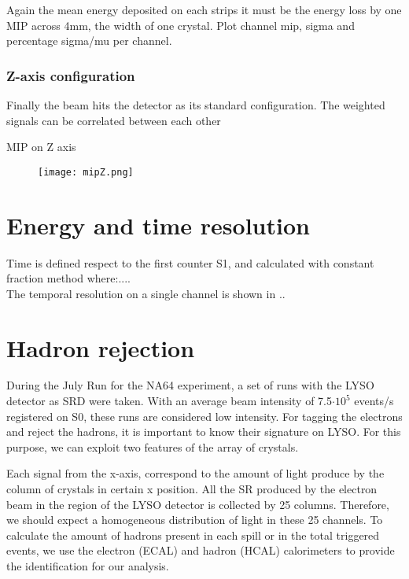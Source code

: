 Again the mean energy deposited on each strips it must be the energy loss by one MIP across 4mm, the width of one
crystal. 
Plot channel mip, sigma and percentage sigma/mu per channel.
\subsubsection{Z-axis configuration}
Finally the beam hits the detector as its standard configuration. The weighted signals can be correlated between each
other

MIP on Z axis\\
\begin{figure}[ht]
	\hspace*{\fill}
	\centering
	\texttt{[image: mipZ.png]}
	\hspace*{\fill}
	\caption{}\label{mipz}
\end{figure}


\section{Energy and time resolution}
Time is defined respect to the first counter S1, and calculated with constant fraction method where:....\\
The temporal resolution on a single channel is shown in ..\\


\section{Hadron rejection}

During the July Run for the NA64 experiment, a set of runs with the LYSO detector as SRD were taken. With an average
beam intensity of 7.5$\cdot 10^5$ events/s registered on S0, these runs are considered low intensity. For tagging the
electrons and reject the hadrons, it is important to know their signature on LYSO. For this purpose, we can exploit two
features of the array of crystals.\par

Each signal from the x-axis, correspond to the amount of light produce by the column of crystals in certain x position.
All the SR produced by the electron beam in the region of the LYSO detector is collected by 25 columns. Therefore, we
should expect a homogeneous distribution of light in these 25 channels. To calculate the amount of hadrons present in
each spill or in the total triggered events, we use the electron (ECAL) and hadron (HCAL) calorimeters to provide the
identification for our analysis.\par

